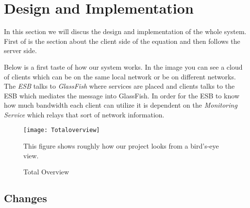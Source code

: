 \section{Design and Implementation}\label{Design and Implementation}
	In this section we will discus the design and implementation of the whole system. First of is the section about the client side of the equation and then follows the server side. 
	
	Below is a first taste of how our system works. In the image you can see a cloud of clients which can be on the same local network or be on different networks. The \textit{ESB} talks to \textit{GlassFish} where services are placed and clients talks to the ESB which mediates the message into GlassFish. In order for the ESB to know how much bandwidth each client can utilize it is dependent on the \textit{Monitoring Service} which relays that sort of network information.
    
    \begin{figure}[H]
        \centering
        \texttt{[image: Totaloverview]}
        \caption{Total Overview}
        This figure shows roughly how our project looks from a bird's-eye view.
        \label{fig:totaloverview}
    \end{figure}

    
    
    
    \subsection{Changes}\label{Changes}
